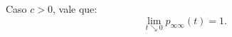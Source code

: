 





\begin{proposicao}
  \label{prop:continuidade}
  Caso $c > 0$, vale que:
  \begin{equation}
    \label{eq:continuidade-infinito}
    \lim_{t \searrow 0}p_{\infty \infty}(t) = 1.    
  \end{equation}
\end{proposicao}

